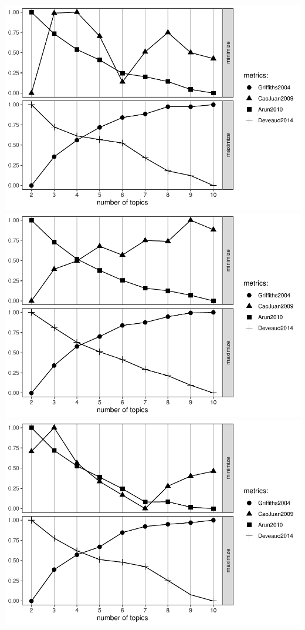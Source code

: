 \documentclass[]{elsarticle} %
\begin{document}
\includegraphics{AST-Framing-Ontario_files/figure-latex/evaluate-lda-1.pdf}
\includegraphics{AST-Framing-Ontario_files/figure-latex/evaluate-lda-2.pdf}
\includegraphics{AST-Framing-Ontario_files/figure-latex/evaluate-lda-3.pdf}
\end{document}
